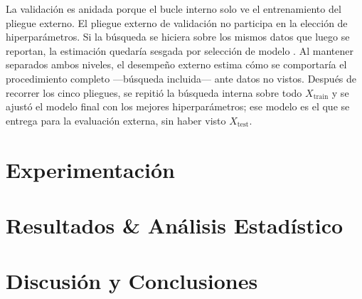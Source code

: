 \documentclass[conference]{IEEEtran}
\begin{document}
    La validación es anidada porque el bucle interno solo ve el entrenamiento del pliegue externo. El pliegue externo de validación no participa en la elección de hiperparámetros. Si la búsqueda se hiciera sobre los mismos datos que luego se reportan, la estimación quedaría sesgada por selección de modelo \cite{cawley2010overfitting,varma2006bias}. Al mantener separados ambos niveles, el desempeño externo estima cómo se comportaría el procedimiento completo —búsqueda incluida— ante datos no vistos. Después de recorrer los cinco pliegues, se repitió la búsqueda interna sobre todo $X_{\text{train}}$ y se ajustó el modelo final con los mejores hiperparámetros; ese modelo es el que se entrega para la evaluación externa, sin haber visto $X_{\text{test}}$.
	\section{Experimentación}
	
	\section{Resultados \& Análisis Estadístico}
	
	\section{Discusión y Conclusiones}
	
\end{document}
